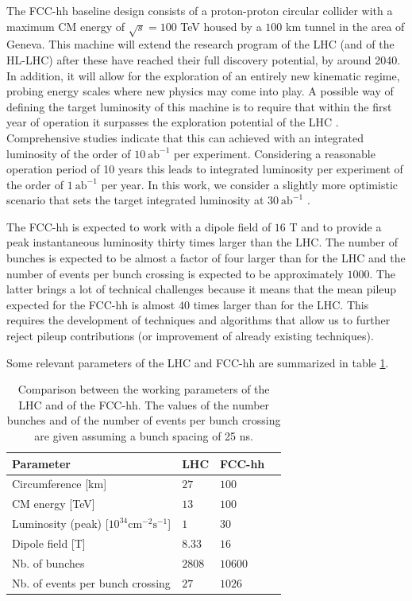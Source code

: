 The FCC-hh baseline design consists of a proton-proton circular collider with a maximum CM energy of $\sqrt{s}=100$ TeV housed by a $100$ km tunnel in the area of Geneva. This machine will extend the research program of the LHC (and of the HL-LHC) after these have reached their full discovery potential, by around 2040. In addition, it will allow for the exploration of an entirely new kinematic regime, probing energy scales where new physics may come into play. A possible way of defining the target luminosity of this machine is to require that within the first year of operation it surpasses the exploration potential of the LHC \cite{FCClumi}. Comprehensive studies \cite{FCCphys,FCClumi} indicate that this can achieved with an integrated luminosity of the order of $10~\text{ab}^{-1}$ per experiment. Considering a reasonable operation period of 10 years this leads to integrated luminosity per experiment of the order of $1~\text{ab}^{-1}$ per year. In this work, we consider a slightly more optimistic scenario that sets the target integrated luminosity at $30~\text{ab}^{-1}$ \cite{hh+jet_100TeV}.

The FCC-hh is expected to work with a dipole field of $16$ T and to provide a peak instantaneous luminosity thirty times larger than the LHC. The number of bunches is expected to be almost a factor of four larger than for the LHC and the number of events per bunch crossing is expected to be approximately $1000$. The latter brings a lot of technical challenges because it means that the mean pileup expected for the FCC-hh is almost $40$ times larger than for the LHC. This requires the development of techniques and algorithms that allow us to further reject pileup contributions (or improvement of already existing techniques). 

Some relevant parameters of the LHC and FCC-hh are summarized in table \ref{table:FCCpara}.

\renewcommand{\arraystretch}{1.2}

\begin{table}
	\centering
	\caption{Comparison between the working parameters of the LHC and of the FCC-hh. The values of the number bunches and of the number of events per bunch crossing are given assuming a bunch spacing of 25 ns.}
	\begin{tabular}{llll}
		\toprule 
		\textbf{Parameter} & \textbf{LHC} & \textbf{FCC-hh} &  \\
		\midrule
		Circumference [km] & $27$ & $100$ &   \\
		\rowcolor{black!7} CM energy [TeV]  & $13$ & $100$ &  \\
		Luminosity (peak) [$\mathrm{10^{34} cm^{-2} s^{-1}}$] & $1$ & $30$ &   \\
		\rowcolor{black!7} Dipole field [T]  & $8.33$ & $16$  &  \\
		Nb. of bunches & $2808$ & $10600$ &   \\
		\rowcolor{black!7} Nb. of events per bunch crossing  & $27$ & $1026$ &  \\
		\bottomrule
	\end{tabular}
	\label{table:FCCpara}
\end{table}

